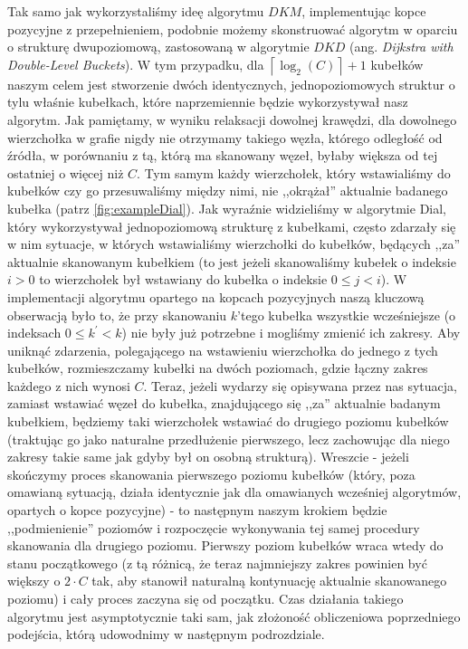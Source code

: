 Tak samo jak wykorzystaliśmy ideę algorytmu $DKM$, implementując kopce pozycyjne z przepełnieniem, podobnie możemy skonstruować algorytm w oparciu o strukturę dwupoziomową, zastosowaną w algorytmie $DKD$ (ang. \textit{Dijkstra with Double-Level Buckets}). W tym przypadku, dla $ \left \lceil \log_{2} \left( C \right) \right \rceil + 1$ kubełków naszym celem jest stworzenie dwóch identycznych, jednopoziomowych struktur o tylu właśnie kubełkach, które naprzemiennie będzie wykorzystywał nasz algorytm. Jak pamiętamy, w wyniku relaksacji dowolnej krawędzi, dla dowolnego wierzchołka w grafie nigdy nie otrzymamy takiego węzła, którego odległość od źródła, w porównaniu z tą, którą ma skanowany węzeł, byłaby większa od tej ostatniej o więcej niż $C$. Tym samym każdy wierzchołek, który wstawialiśmy do kubełków czy go przesuwaliśmy między nimi, nie ,,okrążał'' aktualnie badanego kubełka (patrz \ref{fig:exampleDial}). Jak wyraźnie widzieliśmy w algorytmie Dial, który wykorzystywał jednopoziomową strukturę z kubełkami, często zdarzały się w nim sytuacje, w których wstawialiśmy wierzchołki do kubełków, będących ,,za'' aktualnie skanowanym kubełkiem (to jest jeżeli skanowaliśmy kubełek o indeksie $i > 0$ to wierzchołek był wstawiany do kubełka o indeksie $0 \leqslant j < i$). W implementacji algorytmu opartego na kopcach pozycyjnych naszą kluczową obserwacją było to, że przy skanowaniu $k$'tego kubełka wszystkie wcześniejsze (o indeksach $0 \leqslant k^{'} < k$) nie były już potrzebne i mogliśmy zmienić ich zakresy. Aby uniknąć zdarzenia, polegającego na wstawieniu wierzchołka do jednego z tych kubełków, rozmieszczamy kubełki na dwóch poziomach, gdzie łączny zakres każdego z nich wynosi $C$. Teraz, jeżeli wydarzy się opisywana przez nas sytuacja, zamiast wstawiać węzeł do kubełka, znajdującego się ,,za'' aktualnie badanym kubełkiem, będziemy taki wierzchołek wstawiać do drugiego poziomu kubełków (traktując go jako naturalne przedłużenie pierwszego, lecz zachowując dla niego zakresy takie same jak gdyby był on osobną strukturą). Wreszcie - jeżeli skończymy proces skanowania pierwszego poziomu kubełków (który, poza omawianą sytuacją, działa identycznie jak dla omawianych wcześniej algorytmów, opartych o kopce pozycyjne) - to następnym naszym krokiem będzie ,,podmienienie'' poziomów i rozpoczęcie wykonywania tej samej procedury skanowania dla drugiego poziomu. Pierwszy poziom kubełków wraca wtedy do stanu początkowego (z tą różnicą, że teraz najmniejszy zakres powinien być większy o $2 \cdot C$ tak, aby stanowił naturalną kontynuację aktualnie skanowanego poziomu) i cały proces zaczyna się od początku. Czas działania takiego algorytmu jest asymptotycznie taki sam, jak złożoność obliczeniowa poprzedniego podejścia, którą udowodnimy w następnym podrozdziale.

